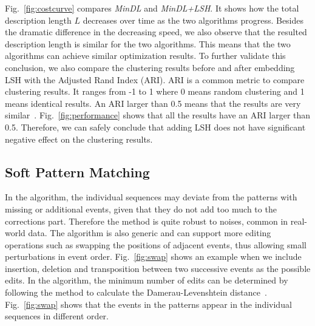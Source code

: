 Fig.~\ref{fig:costcurve} compares \textit{MinDL} and \textit{MinDL+LSH}. It  shows how the total description length $L$ decreases over time as the two algorithms progress. Besides the dramatic difference in the decreasing speed, we also observe that the resulted description length is similar for the two algorithms. This means that the two algorithms can achieve similar optimization results. To further validate this conclusion, we also compare the clustering results before and after embedding LSH with the Adjusted Rand Index (ARI). ARI is a common metric to compare clustering results. It ranges from -1 to 1 where 0 means random clustering and 1 means identical results. An ARI larger than 0.5 means that the results are very similar~\cite{santos2009use}. Fig.~\ref{fig:performance} shows that all the results have an ARI larger than 0.5. Therefore, we can safely conclude that adding LSH does not have significant negative effect on the clustering results.

\subsection{Soft Pattern Matching}  

In the algorithm, the individual sequences may deviate from the patterns with missing or additional events, given that they do not add too much to the corrections part. Therefore the method is quite robust to noises, common in real-world data. The algorithm is also generic and can support more editing operations such as swapping the positions of adjacent events, thus allowing small perturbations in event order. Fig.~\ref{fig:swap} shows an example when we include insertion, deletion and transposition between two successive events as the possible edits. In the algorithm, the minimum number of edits can be determined by following the method to calculate the Damerau-Levenshtein distance~\cite{brill2000improved}. Fig.~\ref{fig:swap} shows that the events in the patterns appear in the individual sequences in different order. 





